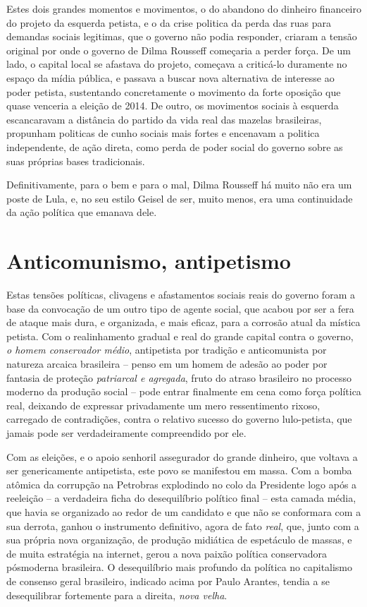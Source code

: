 Estes dois grandes momentos e movimentos, o do abandono do dinheiro
financeiro do projeto da esquerda petista, e o da crise politica da
perda das ruas para demandas sociais legitimas, que o governo não podia
responder, criaram a tensão original por onde o governo de Dilma
Rousseff começaria a perder força. De um lado, o capital local se
afastava do projeto, começava a criticá-lo duramente no espaço da mídia
pública, e passava a buscar nova alternativa de interesse ao poder
petista, sustentando concretamente o movimento da forte oposição que
quase venceria a eleição de 2014. De outro, os movimentos sociais à
esquerda escancaravam a distância do partido da vida real das mazelas
brasileiras, propunham politicas de cunho sociais mais fortes e
encenavam a politica independente, de ação direta, como perda de poder
social do governo sobre as suas próprias bases tradicionais.

Definitivamente, para o bem e para o mal, Dilma Rousseff há muito não
era um poste de Lula, e, no seu estilo Geisel de ser, muito menos, era
uma continuidade da ação política que emanava dele.

\chapter{Anticomunismo, antipetismo}\label{anticomunismo-antipetismo}

Estas tensões políticas, clivagens e afastamentos sociais reais do
governo foram a base da convocação de um outro tipo de agente social,
que acabou por ser a fera de ataque mais dura, e organizada, e mais
eficaz, para a corrosão atual da mística petista. Com o realinhamento
gradual e real do grande capital contra o governo, \emph{o homem
conservador médio}, antipetista por tradição e anticomunista por
natureza arcaica brasileira -- penso em um homem de adesão ao poder por
fantasia de proteção \emph{patriarcal e agregada}, fruto do atraso
brasileiro no processo moderno da produção social -- pode entrar
finalmente em cena como força política real, deixando de expressar
privadamente um mero ressentimento rixoso, carregado de contradições,
contra o relativo sucesso do governo lulo-petista, que jamais pode ser
verdadeiramente compreendido por ele.

Com as eleições, e o apoio senhoril assegurador do grande dinheiro, que
voltava a ser genericamente antipetista, este povo se manifestou em
massa. Com a bomba atômica da corrupção na Petrobras explodindo no colo
da Presidente logo após a reeleição -- a verdadeira ficha do
desequilíbrio político final -- esta camada média, que havia se
organizado ao redor de um candidato e que não se conformara com a sua
derrota, ganhou o instrumento definitivo, agora de fato \emph{real},
que, junto com a sua própria nova organização, de produção midiática de
espetáculo de massas, e de muita estratégia na internet, gerou a nova
paixão política conservadora pósmoderna brasileira. O desequilíbrio mais
profundo da política no capitalismo de consenso geral brasileiro,
indicado acima por Paulo Arantes, tendia a se desequilibrar fortemente
para a direita, \emph{nova velha}.

